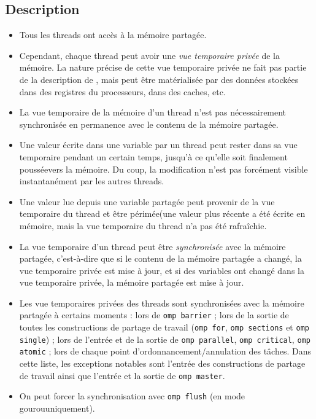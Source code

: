 \subsection{Description}

\begin{itemize}
\item Tous les threads ont accès à la mémoire partagée.

\item Cependant, chaque thread peut avoir une \emph{vue temporaire privée} de la
  mémoire. La nature précise de cette vue temporaire privée ne fait pas partie
  de la description de \OMP, mais peut être matérialisée par des données
  stockées dans des registres du processeurs, dans des caches, etc.

\item La vue temporaire de la mémoire d'un thread n'est pas nécessairement
  synchronisée en permanence avec le contenu de la mémoire partagée.

\item Une valeur écrite dans une variable par un thread peut rester dans sa vue
  temporaire pendant un certain temps, jusqu'à ce qu'elle soit finalement \og
  poussée\fg vers la mémoire. Du coup, la modification n'est pas forcément
  visible instantanément par les autres threads.

\item Une valeur lue depuis une variable partagée peut provenir de la vue
  temporaire du thread et être \og périmée\fg (une valeur plus récente a été
  écrite en mémoire, mais la vue temporaire du thread n'a pas été rafraîchie.

\item La vue temporaire d'un thread peut être \emph{synchronisée} avec
  la mémoire partagée, c'est-à-dire que si le contenu de la mémoire
  partagée a changé, la vue temporaire privée est mise à jour, et si
  des variables ont changé dans la vue temporaire privée, la mémoire
  partagée est mise à jour.
  
\item Les vue temporaires privées des threads sont synchronisées avec
  la mémoire partagée à certains moments : lors de \texttt{omp
    barrier} ; lors de la sortie de toutes les constructions de
  partage de travail (\texttt{omp for}, \texttt{omp sections} et
  \texttt{omp single}) ; lors de l'entrée et de la sortie de
  \texttt{omp parallel}, \texttt{omp critical}, \texttt{omp atomic} ;
  lors de chaque point d'ordonnancement/annulation des tâches. Dans
  cette liste, les exceptions notables sont l'entrée des constructions
  de partage de travail ainsi que l'entrée et la sortie de \texttt{omp
    master}.

\item On peut forcer la synchronisation avec \texttt{omp flush} (en \og mode gourou\fg uniquement).
\end{itemize}

